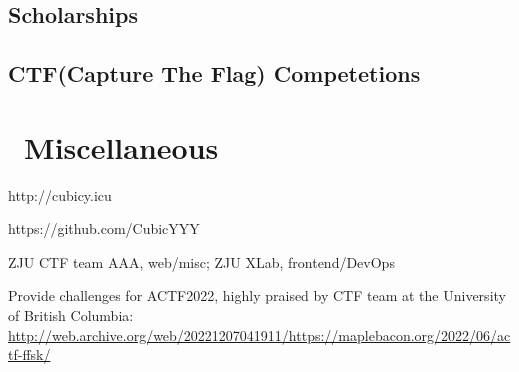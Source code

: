 \documentclass{resume}
\begin{document}
\subsection{Scholarships}

\subsection{CTF(Capture The Flag) Competetions}

\section{\faInfo\ Miscellaneous}
\begin{description}[parsep=0.5ex]
  \item[Blog] http://cubicy.icu
  \item[GitHub] https://github.com/CubicYYY
  \item[Team] ZJU CTF team AAA, web/misc; ZJU XLab, frontend/DevOps
  \item[Other] Provide challenges for ACTF2022, highly praised by CTF team at the University of British Columbia: \href{http://web.archive.org/web/20221207041911/https://maplebacon.org/2022/06/actf-ffsk/}{http://web.archive.org/web/20221207041911/https://maplebacon.org/2022/06/actf-ffsk/}
\end{description}

%
%
\end{document}
